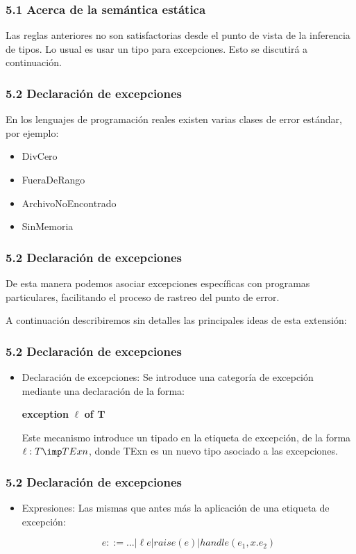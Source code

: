 \documentclass[xcolor=dvipsnames,table,spanish]{beamer}
\begin{document}
\begin{frame}
\frametitle{5.1 Acerca de la semántica estática}
Las reglas anteriores no son satisfactorias desde el punto de vista de la inferencia de tipos. Lo usual es usar un tipo para excepciones. Esto se discutirá a continuación.
\end{frame}
\begin{frame}
\frametitle{5.2 Declaración de excepciones}
En los lenguajes de programación reales existen varias clases de error estándar, por ejemplo:
\begin{itemize}
\item DivCero
\item FueraDeRango
\item ArchivoNoEncontrado
\item SinMemoria
\end{itemize}
\end{frame}
\begin{frame}
\frametitle{5.2 Declaración de excepciones}
De esta manera podemos asociar excepciones específicas con programas particulares, facilitando el proceso de rastreo del punto de error.\newline

A continuación describiremos sin detalles las principales ideas de esta extensión:
\end{frame}
\begin{frame}
\frametitle{5.2 Declaración de excepciones}

\begin{itemize}
\item Declaración de excepciones: Se introduce una categoría de excepción mediante una declaración de la forma:
\begin{center}
\textbf{exception} $\ell$ \textbf{of T}
\end{center}
Este mecanismo introduce un tipado en la etiqueta de excepción, de la forma $\ell : T \imp TExn$, donde TExn es un nuevo tipo asociado a las excepciones.
\end{itemize}

\end{frame}
\begin{frame}
\frametitle{5.2 Declaración de excepciones}
\begin{itemize}
\item Expresiones: Las mismas que antes más la aplicación de una etiqueta de excepción:

\[ e::=...|\ell e|raise(e)|handle(e_1,x.e_2)\]

\end{itemize}
\end{frame}
\end{document}
